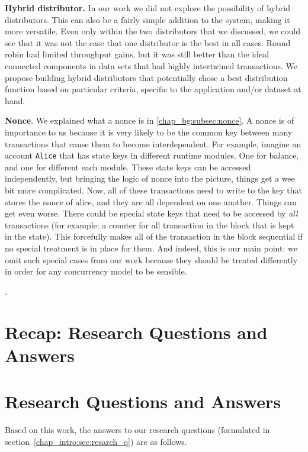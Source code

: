 \textbf{Hybrid distributor.} In our work we did not explore the possibility of hybrid distributors.
This can also be a fairly simple addition to the system, making it more versatile. Even only within
the two distributors that we discussed, we could see that it was not the case that one distributor
is the best in all cases. Round robin had limited throughput gains, but it was still better than the
ideal connected components in data sets that had highly intertwined transactions. We propose
building hybrid distributors that potentially chose a best distribution function based on particular
criteria, specific to the application and/or dataset at hand.

\textbf{Nonce}. We explained what a nonce is in \ref{chap_bg:subsec:nonce}. A nonce is of importance
to us because it is very likely to be the common key between many transactions that cause them to
become interdependent. For example, imagine an account \texttt{Alice} that has state keys in
different runtime modules. One for balance, and one for different each module. These state keys can
be accessed independently, but bringing the logic of nonce into the picture, things get a wee bit
more complicated. Now, all of these transactions need to write to the key that stores the nonce of
alice, and they are all dependent on one another. Things can get even worse. There could be special
state keys that need to be accessed by \textit{all} transactions (for example: a counter for all
transaction in the block that is kept in the state). This forcefully makes all of the transaction in
the block sequential if no special treatment is in place for them. And indeed, this is our main
point: we omit such special cases from our work because they should be treated differently in order
for any concurrency model to be sensible.

.

\section{Recap: Research Questions and Answers}

\section{Research Questions and Answers}
Based on this work, the answers to our research questions (formulated in
section~\ref{chap_intro:sec:resarch_q}) are as follows.

